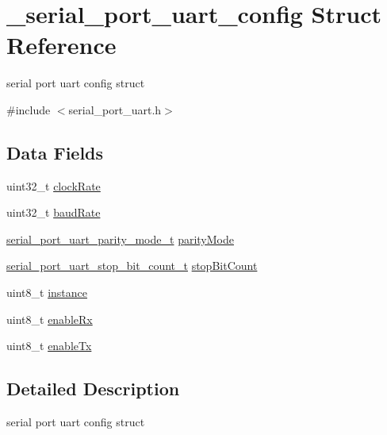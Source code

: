 \hypertarget{struct__serial__port__uart__config}{}\section{\+\_\+serial\+\_\+port\+\_\+uart\+\_\+config Struct Reference}
\label{struct__serial__port__uart__config}


serial port uart config struct  




{\ttfamily \#include $<$serial\+\_\+port\+\_\+uart.\+h$>$}

\subsection*{Data Fields}
\begin{DoxyCompactItemize}
\item 
uint32\+\_\+t \mbox{\hyperlink{struct__serial__port__uart__config_abe13cc0e6ef4825ed997d630d9e45c45}{clock\+Rate}}
\item 
uint32\+\_\+t \mbox{\hyperlink{struct__serial__port__uart__config_ab38a80feace530cdca66134f6e3801aa}{baud\+Rate}}
\item 
\mbox{\hyperlink{group__serial__port__uart_ga3980002a1791549605701a7822bec4ba}{serial\+\_\+port\+\_\+uart\+\_\+parity\+\_\+mode\+\_\+t}} \mbox{\hyperlink{struct__serial__port__uart__config_a9c90a7fdfd19cd1c99826dbbebea2d96}{parity\+Mode}}
\item 
\mbox{\hyperlink{group__serial__port__uart_ga2a0798b3cc6db94c65bf067bcfe73b12}{serial\+\_\+port\+\_\+uart\+\_\+stop\+\_\+bit\+\_\+count\+\_\+t}} \mbox{\hyperlink{struct__serial__port__uart__config_a5f63f60b4ce406506c35be15323ad266}{stop\+Bit\+Count}}
\item 
uint8\+\_\+t \mbox{\hyperlink{struct__serial__port__uart__config_a0247bf27ecd553eeb029a06b1e6ec354}{instance}}
\item 
uint8\+\_\+t \mbox{\hyperlink{struct__serial__port__uart__config_aa71c95a745f5bb5f666e55f7c98e4e9f}{enable\+Rx}}
\item 
uint8\+\_\+t \mbox{\hyperlink{struct__serial__port__uart__config_a4e1a6dc4f40cf76369024809e1f4163d}{enable\+Tx}}
\end{DoxyCompactItemize}


\subsection{Detailed Description}
serial port uart config struct 

